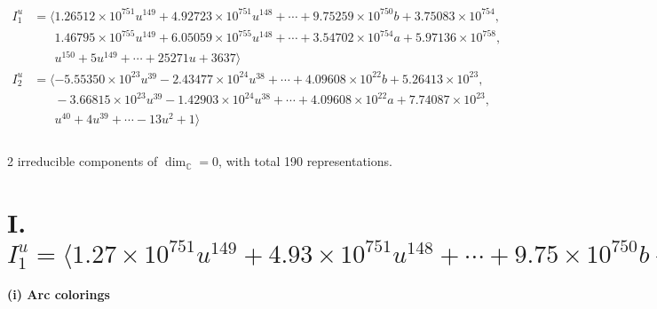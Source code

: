 \documentclass[1p]{elsarticle_modified}
\theoremstyle{definition}
\begin{document}
\begin{align*}
I^u_{1}&=\langle 
1.26512\times10^{751} u^{149}+4.92723\times10^{751} u^{148}+\cdots+9.75259\times10^{750} b+3.75083\times10^{754},\\
\phantom{I^u_{1}}&\phantom{= \langle  }1.46795\times10^{755} u^{149}+6.05059\times10^{755} u^{148}+\cdots+3.54702\times10^{754} a+5.97136\times10^{758},\\
\phantom{I^u_{1}}&\phantom{= \langle  }u^{150}+5 u^{149}+\cdots+25271 u+3637\rangle \\
I^u_{2}&=\langle 
-5.55350\times10^{23} u^{39}-2.43477\times10^{24} u^{38}+\cdots+4.09608\times10^{22} b+5.26413\times10^{23},\\
\phantom{I^u_{2}}&\phantom{= \langle  }-3.66815\times10^{23} u^{39}-1.42903\times10^{24} u^{38}+\cdots+4.09608\times10^{22} a+7.74087\times10^{23},\\
\phantom{I^u_{2}}&\phantom{= \langle  }u^{40}+4 u^{39}+\cdots-13 u^2+1\rangle \\
\\
\end{align*}
\raggedright * 2 irreducible components of $\dim_{\mathbb{C}}=0$, with total 190 representations.\\
\newpage
\renewcommand{\arraystretch}{1}
\centering \section*{I. $I^u_{1}= \langle 1.27\times10^{751} u^{149}+4.93\times10^{751} u^{148}+\cdots+9.75\times10^{750} b+3.75\times10^{754},\;1.47\times10^{755} u^{149}+6.05\times10^{755} u^{148}+\cdots+3.55\times10^{754} a+5.97\times10^{758},\;u^{150}+5 u^{149}+\cdots+25271 u+3637 \rangle$}
\flushleft \textbf{(i) Arc colorings}\\
\end{document}
